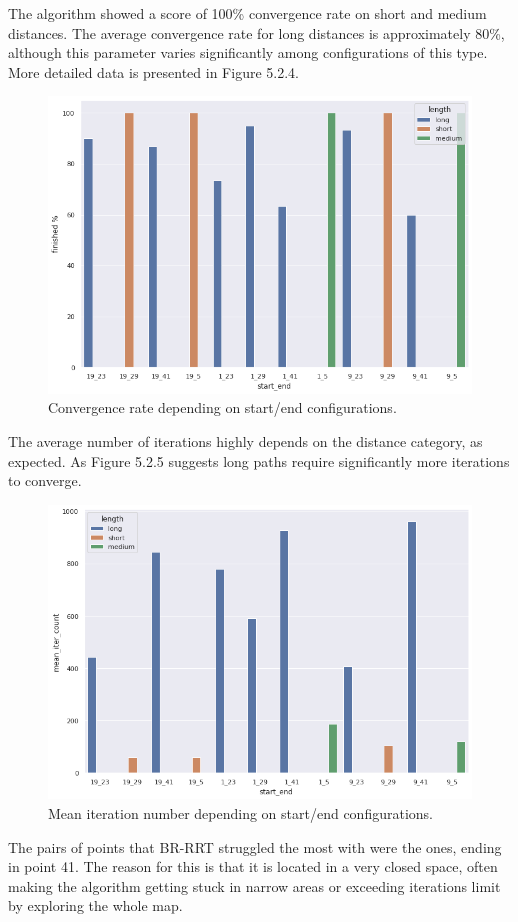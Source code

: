 \documentclass[12pt]{article}
\DeclareRobustCommand{\[}{\begin{equation}}
\DeclareRobustCommand{\]}{\end{equation}}
\numberwithin{equation}{section}
\begin{document}
The algorithm showed a score of 100\% convergence rate on short and medium distances. The average convergence rate for long distances is approximately 80\%, although this parameter varies significantly among configurations of this type. More detailed data is presented in Figure 5.2.4.

\begin{figure}[H]
\begin{center}
\includegraphics[scale=0.5]{images/se_finished.png}
\captionsetup{width=0.6\textwidth}
\caption{Convergence rate depending on start/end configurations.}
\end{center}
\end{figure}

The average number of iterations highly depends on the distance category, as expected. As Figure 5.2.5 suggests long paths require significantly more iterations to converge.

\begin{figure}[H]
\begin{center}
\includegraphics[scale=0.5]{images/se_iter_count.png}
\captionsetup{width=0.6\textwidth}
\caption{Mean iteration number depending on start/end configurations.}
\end{center}
\end{figure}

The pairs of points that BR-RRT struggled the most with were the ones, ending in point 41. The reason for this is that it is located in a very closed space, often making the algorithm getting stuck in narrow areas or exceeding iterations limit by exploring the whole map.
\end{document}
